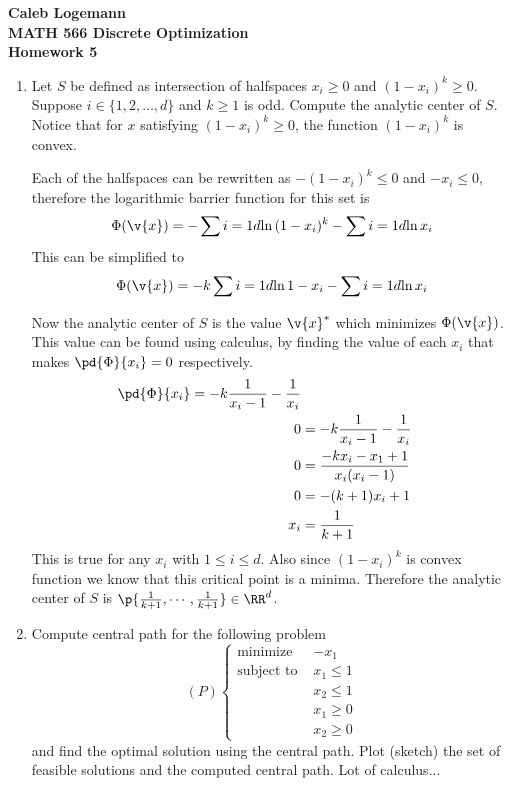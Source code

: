 \documentclass[11pt, oneside]{article}
\begin{document}
\noindent \textbf{\Large{Caleb Logemann \\
MATH 566 Discrete Optimization\\
Homework 5
}}

%
\begin{enumerate}
  \item %
    Let $S$ be defined as intersection of halfspaces $x_i \geq 0$ and $(1-x_i)^k \geq 0$.
    Suppose $i \in \{1,2,\ldots,d\}$ and $k \geq 1$ is odd.
    Compute the analytic center of $S$.
    Notice that for $x$ satisfying $(1-x_i)^k \geq 0$, the function $(1-x_i)^k$ is convex.

    Each of the halfspaces can be rewritten as $-(1 - x_i)^k \le 0$ and
    $-x_i \le 0$, therefore the logarithmic barrier function for this set is
    \[
      \Phi(\v{x}) = -\sum{i = 1}{d}{\ln{(1 - x_i)^k}} - \sum{i=1}{d}{\ln{x_i}}
    \]
    This can be simplified to
    \[
      \Phi(\v{x}) = -k\sum{i = 1}{d}{\ln{1 - x_i}} - \sum{i=1}{d}{\ln{x_i}}
    \]

    Now the analytic center of $S$ is the value $\v{x}^*$ which minimizes $\Phi(\v{x})$.
    This value can be found using calculus, by finding the value of each $x_i$
    that makes $\pd{\Phi}{x_i} = 0$ respectively.
    \begin{align*}
      \pd{\Phi}{x_i} = -k\frac{1}{x_i - 1} - \frac{1}{x_i} \\
      0 &= -k\frac{1}{x_i - 1} - \frac{1}{x_i} \\
      0 &= \frac{-k x_i - x_1 + 1}{x_i(x_i - 1)} \\
      0 &= -(k+1)x_i + 1 \\
      x_i &= \frac{1}{k+1} \\
    \end{align*}
    This is true for any $x_i$ with $1 \le i \le d$.
    Also since $(1 - x_i)^k$ is convex function we know that this critical point
    is a minima.
    Therefore the analytic center of $S$ is
    $\p{\frac{1}{k+1}, \cdots, \frac{1}{k+1}} \in \RR^d$.

  \item %
    Compute central path for the following problem
    \[
      (P)
      \begin{cases} 
        \text{minimize }   & -x_1 \\
        \text{subject to } & x_1 \leq 1 \\
                           & x_2 \leq 1 \\
                           & x_1 \geq 0 \\
                           & x_2 \geq 0
      \end{cases}
    \]
    and find the optimal solution using the central path.
    Plot (sketch) the set of feasible solutions and the computed central path.
    Lot of calculus...




\end{enumerate}
\end{document}
